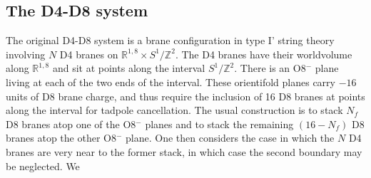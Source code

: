 \documentclass[12pt]{article}
\begin{document}
\subsection{The D4-D8 system}
The original D4-D8 system  is a brane configuration in type I' string theory involving $N$ D4 branes on $\mathbb R^{1,8} \times S^1/\mathbb Z^2$. The D4 branes have their worldvolume along $\mathbb R^{1,8}$ and sit at points along the interval $S^1/\mathbb Z^2$. There is an O8$^-$ plane living at each of the two ends of the interval. These orientifold planes carry $-16$ units of D8 brane charge, and thus require the inclusion of 16 D8 branes at points along the interval for tadpole cancellation. The usual construction is to stack $N_f$ D8 branes atop one of the O8$^-$ planes and to stack the remaining $(16-N_f)$ D8 branes atop the other O8$^-$ plane. One then considers the case in which the $N$ D4 branes are very near to the former stack, in which case the second boundary may be neglected. We
\end{document}
